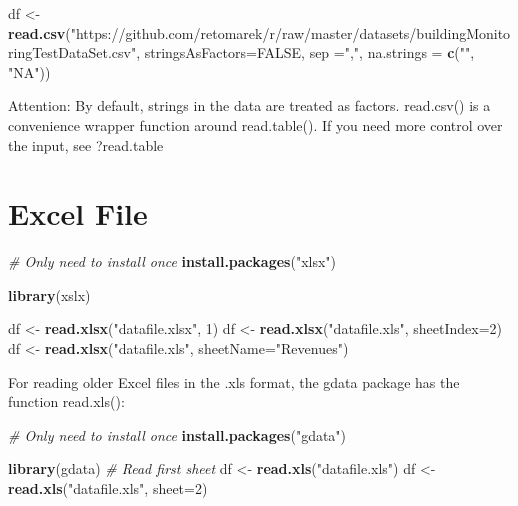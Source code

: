 \documentclass[
]{book}
\newenvironment{Shaded}{\begin{snugshade}}{\end{snugshade}}
\newcommand{\CommentTok}[1]{\textcolor[rgb]{0.56,0.35,0.01}{\textit{#1}}}
\newcommand{\DataTypeTok}[1]{\textcolor[rgb]{0.13,0.29,0.53}{#1}}
\newcommand{\DecValTok}[1]{\textcolor[rgb]{0.00,0.00,0.81}{#1}}
\newcommand{\KeywordTok}[1]{\textcolor[rgb]{0.13,0.29,0.53}{\textbf{#1}}}
\newcommand{\NormalTok}[1]{#1}
\newcommand{\OtherTok}[1]{\textcolor[rgb]{0.56,0.35,0.01}{#1}}
\newcommand{\StringTok}[1]{\textcolor[rgb]{0.31,0.60,0.02}{#1}}
\let\oldShaded\Shaded
\let\endoldShaded\endShaded
\renewenvironment{Shaded}{\footnotesize\oldShaded}{\endoldShaded}
\begin{document}
\begin{Shaded}
\begin{Highlighting}[]
\NormalTok{df <-}\StringTok{ }\KeywordTok{read.csv}\NormalTok{(}\StringTok{"https://github.com/retomarek/r/raw/master/datasets/buildingMonitoringTestDataSet.csv"}\NormalTok{,}
               \DataTypeTok{stringsAsFactors=}\OtherTok{FALSE}\NormalTok{,}
               \DataTypeTok{sep =}\StringTok{","}\NormalTok{,}
               \DataTypeTok{na.strings =} \KeywordTok{c}\NormalTok{(}\StringTok{""}\NormalTok{, }\StringTok{"NA"}\NormalTok{))}
\end{Highlighting}
\end{Shaded}

Attention: By default, strings in the data are treated as factors.
read.csv() is a convenience wrapper function around read.table(). If you need more control over the input, see ?read.table

\hypertarget{excel-file}{%
\section{Excel File}\label{excel-file}}

\begin{Shaded}
\begin{Highlighting}[]
\CommentTok{# Only need to install once}
\KeywordTok{install.packages}\NormalTok{(}\StringTok{"xlsx"}\NormalTok{)}

\KeywordTok{library}\NormalTok{(xslx)}

\NormalTok{df <-}\StringTok{ }\KeywordTok{read.xlsx}\NormalTok{(}\StringTok{"datafile.xlsx"}\NormalTok{, }\DecValTok{1}\NormalTok{)}
\NormalTok{df <-}\StringTok{ }\KeywordTok{read.xlsx}\NormalTok{(}\StringTok{"datafile.xls"}\NormalTok{, }\DataTypeTok{sheetIndex=}\DecValTok{2}\NormalTok{)}
\NormalTok{df <-}\StringTok{ }\KeywordTok{read.xlsx}\NormalTok{(}\StringTok{"datafile.xls"}\NormalTok{, }\DataTypeTok{sheetName=}\StringTok{"Revenues"}\NormalTok{)}
\end{Highlighting}
\end{Shaded}

For reading older Excel files in the .xls format, the gdata package has the function read.xls():

\begin{Shaded}
\begin{Highlighting}[]
\CommentTok{# Only need to install once}
\KeywordTok{install.packages}\NormalTok{(}\StringTok{"gdata"}\NormalTok{)}

\KeywordTok{library}\NormalTok{(gdata)}
\CommentTok{# Read first sheet}
\NormalTok{df <-}\StringTok{ }\KeywordTok{read.xls}\NormalTok{(}\StringTok{"datafile.xls"}\NormalTok{)}
\NormalTok{df <-}\StringTok{ }\KeywordTok{read.xls}\NormalTok{(}\StringTok{"datafile.xls"}\NormalTok{, }\DataTypeTok{sheet=}\DecValTok{2}\NormalTok{)}
\end{Highlighting}
\end{Shaded}
\end{document}
